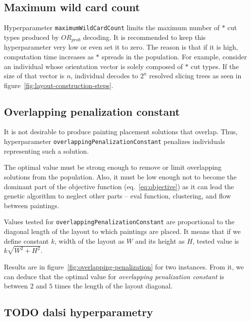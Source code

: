\subsection{Maximum wild card count}\label{subsec:maximum-wild-card-count}
Hyperparameter \verb|maximumWildCardCount| limits the maximum number of $*$ cut types produced by $OR_{prob}$ decoding.
It is recommended to keep this hyperparameter very low or even set it to zero.
The reason is that if it is high, computation time increases as $*$ spreads in the population.
For example, consider an individual whose orientation vector is solely composed of $*$ cut types.
If the size of that vector is $n$, individual decodes to $2^n$ resolved slicing trees as seen in figure~\ref{fig:layout-construction-steps}.

\subsection{Overlapping penalization constant}\label{subsec:overlapping-penalization-constant}

It is not desirable to produce painting placement solutions that overlap.
Thus, hyperparameter \verb|overlappingPenalizationConstant| penalizes
individuals representing such a solution.

The optimal value must be strong enough to remove or limit overlapping solutions from the population.
Also, it must be low enough not to become the dominant part of the objective function (eq.~\ref{eq:objective})
as it can lead the genetic algorithm to neglect other parts – eval function, clustering, and flow between paintings.

Values tested for \verb|overlappingPenalizationConstant| are proportional to the diagonal
length of the layout to which paintings are placed.
It means that if we define constant $k$, width of the layout as $W$ and its height as $H$,
tested value is $k\sqrt{W^2 + H^2}$.

Results are in figure~\ref{fig:overlapping-penalization} for two instances.
From it, we can deduce that the optimal value for \textit{overlapping penalization constant} is between $2$ and $5$ times the length of the layout diagonal.

\subsection{TODO dalsi hyperparametry}

